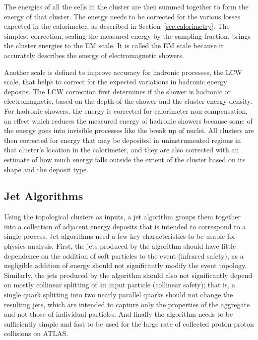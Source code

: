 The energies of all the cells in the cluster are then summed together to form the energy of that cluster.
The energy needs to be corrected for the various losses expected in the calorimeter, as described in Section~\ref{sec:calorimetry}.
The simplest correction, scaling the measured energy by the sampling fraction, brings the cluster energies to the \ac{EM} scale.
It is called the \ac{EM} scale because it accurately describes the energy of electromagnetic showers.

Another scale is defined to improve accuracy for hadronic processes, the \ac{LCW} scale, that helps to correct for the expected variations in hadronic energy deposits.
The \ac{LCW} correction first determines if the shower is hadronic or electromagnetic, based on the depth of the shower and the cluster energy density.
For hadronic showers, the energy is corrected for calorimeter non-compensation, an effect which reduces the measured energy of hadronic showers because some of the energy goes into invisible processes like the break up of nuclei.
All clusters are then corrected for energy that may be deposited in uninstrumented regions in that cluster's location in the calorimeter, and they are also corrected with an estimate of how much energy falls outside the extent of the cluster based on its shape and the deposit type.

\subsection{Jet Algorithms}
Using the topological clusters as inputs, a jet algorithm groups them together into a collection of adjacent energy deposits that is intended to correspond to a single process.
Jet algorithms need a few key characteristics to be usable for physics analysis.
First, the jets produced by the algorithm should have little dependence on the addition of soft particles to the event (infrared safety), as a negligible addition of energy should not significantly modify the event topology.
Similarly, the jets produced by the algorithm should also not significantly depend on mostly collinear splitting of an input particle (collinear safety); that is, a single quark splitting into two nearly parallel quarks should not change the resulting jets, which are intended to capture only the properties of the aggregate and not those of individual particles.
And finally the algorithm needs to be sufficiently simple and fast to be used for the large rate of collected proton-proton collisions on \ac{ATLAS}.

